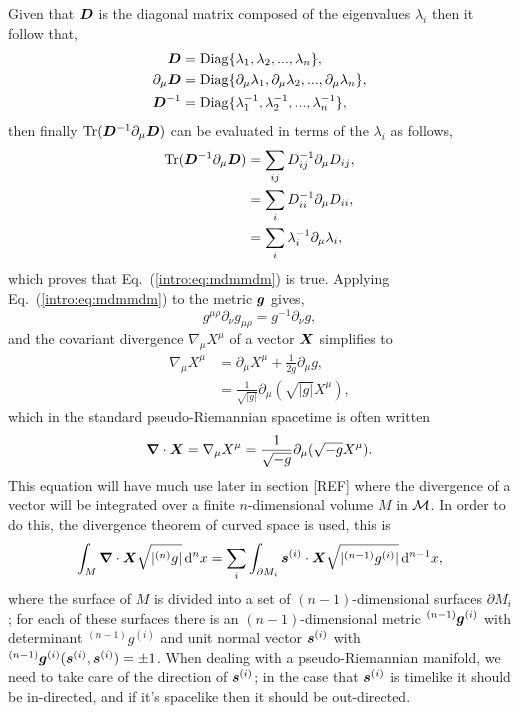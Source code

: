Given that $\boldsymbol{D}$ is the diagonal matrix composed of the eigenvalues $\lambda_i$ then it follow that,
\begin{align}
\boldsymbol{D} &= \mathrm{Diag}\{\lambda_1,\lambda_2,...,\lambda_n\} ,\\
\partial_\mu\boldsymbol{D} &= \mathrm{Diag}\{\partial_\mu\lambda_1,\partial_\mu\lambda_2,...,\partial_\mu\lambda_n\} ,\\
\boldsymbol{D}^{-1} &= \mathrm{Diag}\{\lambda^{-1}_1,\lambda^{-1}_2,...,\lambda^{-1}_n\} ,
\end{align}
then finally $\mathrm{Tr}(\boldsymbol{D}^{-1} \partial_\mu \boldsymbol{D})$ can be evaluated in terms of the $\lambda_i$ as follows,
\begin{align}
\mathrm{Tr}(\boldsymbol{D}^{-1} \partial_\mu \boldsymbol{D}) &= \sum_{ij} D^{-1}_{ij} \partial_\mu D_{ij} ,\\
&= \sum_i D^{-1}_{ii} \partial_\mu D_{ii} ,\\
&= \sum_i \lambda_i^{-1} \partial_\mu \lambda_i,
\end{align}
which proves that Eq.~(\ref{intro:eq:mdmmdm}) is true. Applying Eq.~(\ref{intro:eq:mdmmdm}) to the metric $\boldsymbol{g}$ gives,
\begin{equation} \label{intro:eq:gdggdg}
g^{\mu\rho}\partial_\nu g_{\mu\rho} = g^{-1} \partial_\nu g,
\end{equation}
and the covariant divergence $\nabla_\mu X^\mu$ of a vector $\boldsymbol{X}$ simplifies to 
\begin{align}
\nabla_\mu X^\mu &= \partial_\mu X^\mu + \frac{1}{2g}\partial_\mu g ,\\
&= \frac{1}{\sqrt{|g|}}\partial_\mu \left(\sqrt{|g|}X^\mu\right),
\end{align}
which in the standard pseudo-Riemannian spacetime is often written
\begin{equation} \label{intro:eq:div_vector}
\boldsymbol{\nabla}\cdot \boldsymbol{X} = \nabla_\mu X^\mu = \frac{1}{\sqrt{-g}}\partial_\mu (\sqrt{-g}X^\mu).
\end{equation}
This equation will have much use later in section [REF] where the divergence of a vector will be integrated over a finite $n$-dimensional volume $M$ in $\mathcal{M}$. In order to do this, the divergence theorem of curved space is used, this is 
\begin{equation}
\int_M \boldsymbol{\nabla} \cdot \boldsymbol{X} \sqrt{|{}^{(n)}g|} \,\dd^n x = \sum_i \int_{\partial M_i} \boldsymbol{s}^{(i)} \cdot \boldsymbol{X} \sqrt{|{}^{(n-1)}g^{(i)}|} \,\dd^{n-1} x,
\end{equation}
where the surface of $M$ is divided into a set of $(n-1)$-dimensional surfaces $\partial M_i$; for each of these surfaces there is an $(n-1)$-dimensional metric ${}^{(n-1)}\boldsymbol{g}^{(i)}$ with determinant ${}^{(n-1)} g ^{(i)}$ and unit normal vector $\boldsymbol{s}^{(i)}$ with ${}^{(n-1)}\boldsymbol{g}^{(i)}(\boldsymbol{s}^{(i)},\boldsymbol{s}^{(i)})=\pm 1$. When dealing with a pseudo-Riemannian manifold, we need to take care of the direction of $\boldsymbol{s}^{(i)}$; in the case that $\boldsymbol{s}^{(i)}$ is timelike it should be in-directed, and if it's spacelike then it should be out-directed. 

